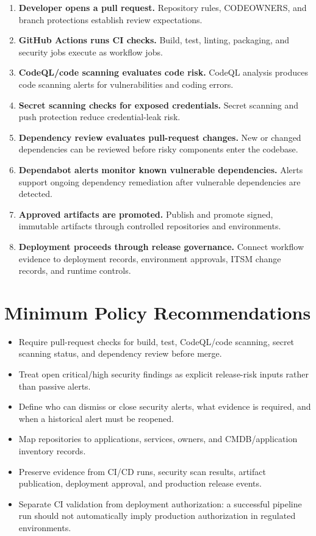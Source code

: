 \documentclass[11pt]{article}
\providecommand{\term}[1]{\textbf{#1}}
\begin{document}
\begin{enumerate}
  \item \term{Developer opens a pull request.} Repository rules, CODEOWNERS, and branch protections establish review expectations.
  \item \term{GitHub Actions runs CI checks.} Build, test, linting, packaging, and security jobs execute as workflow jobs.
  \item \term{CodeQL/code scanning evaluates code risk.} CodeQL analysis produces code scanning alerts for vulnerabilities and coding errors.\cite{github-codeql-about}
  \item \term{Secret scanning checks for exposed credentials.} Secret scanning and push protection reduce credential-leak risk.\cite{github-ghas-about,github-security-settings}
  \item \term{Dependency review evaluates pull-request changes.} New or changed dependencies can be reviewed before risky components enter the codebase.\cite{github-dependency-review}
  \item \term{Dependabot alerts monitor known vulnerable dependencies.} Alerts support ongoing dependency remediation after vulnerable dependencies are detected.\cite{github-dependabot-alerts}
  \item \term{Approved artifacts are promoted.} Publish and promote signed, immutable artifacts through controlled repositories and environments.
  \item \term{Deployment proceeds through release governance.} Connect workflow evidence to deployment records, environment approvals, ITSM change records, and runtime controls.
\end{enumerate}

\section{Minimum Policy Recommendations}

\begin{itemize}
  \item Require pull-request checks for build, test, CodeQL/code scanning, secret scanning status, and dependency review before merge.
  \item Treat open critical/high security findings as explicit release-risk inputs rather than passive alerts.
  \item Define who can dismiss or close security alerts, what evidence is required, and when a historical alert must be reopened.
  \item Map repositories to applications, services, owners, and CMDB/application inventory records.
  \item Preserve evidence from CI/CD runs, security scan results, artifact publication, deployment approval, and production release events.
  \item Separate CI validation from deployment authorization: a successful pipeline run should not automatically imply production authorization in regulated environments.
\end{itemize}
\end{document}
